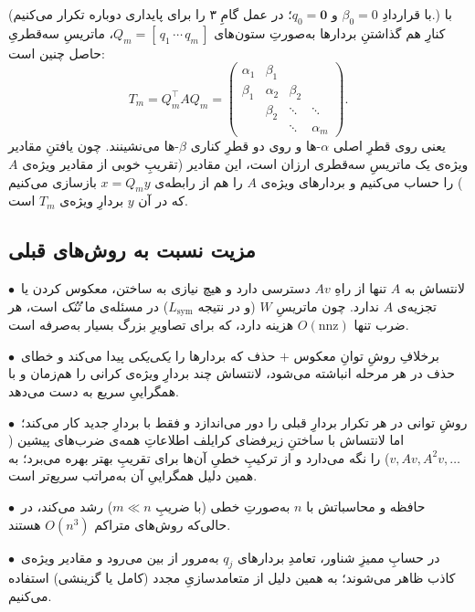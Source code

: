 \documentclass[14pt]{extarticle}
\newcommand{\T}{^{\top}}
\begin{document}
\noindent (با قراردادِ $\beta_0=0$ و $q_0=\mathbf 0$؛ در عمل گامِ ۳ را برای پایداری دوباره تکرار می‌کنیم.) با کنارِ هم گذاشتنِ بردارها به‌صورتِ ستون‌های $Q_m=[\,q_1\,\cdots\,q_m\,]$، ماتریسِ سه‌قطریِ حاصل چنین است:
\[
T_m=Q_m\T A Q_m=
\begin{pmatrix}
\alpha_1 & \beta_1 & & \\
\beta_1 & \alpha_2 & \beta_2 & \\
& \beta_2 & \ddots & \ddots\\
& & \ddots & \alpha_m
\end{pmatrix}.
\]
یعنی روی قطرِ اصلی $\alpha$-ها و روی دو قطرِ کناری $\beta$-ها می‌نشینند. چون یافتنِ مقادیر ویژه‌ی یک ماتریسِ سه‌قطری ارزان است، این مقادیر (تقریبِ خوبی از مقادیر ویژه‌ی $A$) را حساب می‌کنیم و بردارهای ویژه‌ی $A$ را هم از رابطه‌ی $x=Q_m y$ بازسازی می‌کنیم که در آن $y$ بردارِ ویژه‌ی $T_m$ است.

\subsection{مزیت نسبت به روش‌های قبلی}

\smallskip
\noindent$\bullet$~لانتساش به $A$ تنها از راهِ $Av$ دسترسی دارد و هیچ نیازی به
ساختن، معکوس کردن یا تجزیه‌ی $A$ ندارد. چون ماتریسِ $W$ (و در نتیجه $L_{\mathrm{sym}}$)
در مسئله‌ی ما \emph{تُنُک} است، هر ضرب تنها $O(\mathrm{nnz})$ هزینه دارد، که برای تصاویرِ
بزرگ بسیار به‌صرفه است.

\smallskip
\noindent$\bullet$~برخلافِ روشِ توانِ معکوس $+$ حذف که بردارها را
\emph{یکی‌یکی} پیدا می‌کند و خطای حذف در هر مرحله انباشته می‌شود، لانتساش چند بردارِ ویژه‌ی کرانی را
هم‌زمان و با همگراییِ سریع به دست می‌دهد.

\smallskip
\noindent$\bullet$~روشِ توانی در هر تکرار بردارِ قبلی را دور می‌اندازد و فقط با بردارِ جدید کار می‌کند؛ اما لانتساش با ساختنِ زیرفضای کرایلف اطلاعاتِ همه‌ی ضرب‌های پیشین ($v,Av,A^2v,\dots$) را نگه می‌دارد و از ترکیبِ خطیِ آن‌ها برای تقریبِ بهتر بهره می‌برد؛ به همین دلیل همگراییِ آن به‌مراتب سریع‌تر است.

\smallskip
\noindent$\bullet$~حافظه و محاسباتش با $n$ به‌صورتِ خطی (با ضریبِ $m\ll n$)
رشد می‌کند، در حالی‌که روش‌های متراکم $O(n^3)$ هستند.

\smallskip
\noindent$\bullet$~در حسابِ ممیزِ شناور، تعامدِ بردارهای $q_j$ به‌مرور از بین می‌رود و
مقادیر ویژه‌ی کاذب ظاهر می‌شوند؛ به همین دلیل از متعامدسازیِ مجدد (کامل یا گزینشی)
استفاده می‌کنیم.
\end{document}
